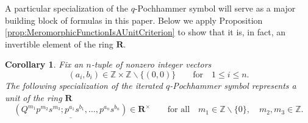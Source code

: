 \documentclass{amsart}
\newtheorem{corollary}[theorem]{Corollary}
\begin{document}
A particular specialization of the $q$-Pochhammer symbol will serve as a major building block of formulas in this paper. Below we apply Proposition \ref{prop:MeromorphicFunctionIsAUnitCriterion} to show that it is, in fact, an invertible element of the ring $\mathbf R$.
\begin{corollary}
Fix an $n$-tuple of nonzero integer vectors
\begin{equation*}
(a_i,b_i)\in \mathbb Z\times\mathbb Z\backslash\{(0,0)\}\qquad \textrm{for}\quad 1\leq i\leq n.
\end{equation*}
The following specialization of the iterated $q$-Pochhammer symbol represents a unit of the ring $\mathbf R$
\begin{equation}
\underline{(Q^{m_1}p^{m_2}s^{m_3};p^{a_1}s^{b_1},\dots,p^{a_n}s^{b_n})}\in\mathbf R^\times\qquad\textrm{for all}\quad m_1\in\mathbb Z\backslash\{0\},\quad m_2,m_3\in\mathbb Z.
\label{eq:SpecializedPochhammerEquivalenceClassMultiplicative}
\end{equation}
\end{corollary}
\end{document}
